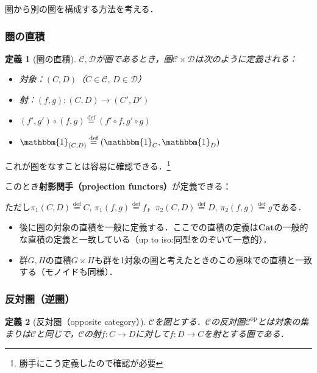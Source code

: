 \documentclass[dvipdfmx,a4j,10pt]{jsarticle}
\theoremstyle{mystyle1}
\theoremstyle{mystyle2}
\newtheorem{dfn*}{定義}
\newcommand*{\defeq}{\stackrel{\text{def}}{=}}
\newcommand{\Cat}{\mathbf{Cat}}
\begin{document}
	圏から別の圏を構成する方法を考える．

	\subsubsection{圏の直積}

	\begin{dfn*}[圏の直積]
		$\mathcal{C},\mathcal{D}$が圏であるとき，圏$\mathcal{C}\times\mathcal{D}$は次のように定義される：
		\begin{itemize}
			\item 対象：$(C,D)$（$C\in\mathcal{C},\, D\in\mathcal{D}$）
			\item 射：$(f,g):(C,D)\to(C',D')$
			\item $(f',g')\circ(f,g)\defeq(f'\circ f,g'\circ g)$
			\item $\mathbbm{1}_{(C,D)}\defeq(\mathbbm{1}_C,\mathbbm{1}_D)$
		\end{itemize}
	\end{dfn*}

	これが圏をなすことは容易に確認できる．\footnote{勝手にこう定義したので確認が必要}

	このとき\textbf{射影関手（projection functors）}が定義できる：

	\begin{center}
	\end{center}
	ただし$\pi_1(C,D)\defeq C,\, \pi_1(f,g)\defeq f$，$\pi_2(C,D)\defeq D,\, \pi_2(f,g)\defeq g$である．

	\begin{itemize}
		\item 後に圏の対象の直積を一般に定義する．ここでの直積の定義は$\Cat$の一般的な直積の定義と一致している（up to iso:同型をのぞいて一意的）．
		\item 群$G,H$の直積$G\times H$も群を1対象の圏と考えたときのこの意味での直積と一致する（モノイドも同様）．
	\end{itemize}

	\subsubsection{反対圏（逆圏）}

	\begin{dfn*}[反対圏（opposite category）\footnotemark]
		$\mathcal{C}$を圏とする．$\mathcal{C}$の反対圏$\mathcal{C}^{\mathrm{op}}$とは対象の集まりは$\mathcal{C}$と同じで，$\mathcal{C}$の射$f:C\to D$に対して$f:D\to C$を射とする圏である．
	\end{dfn*}
\end{document}
